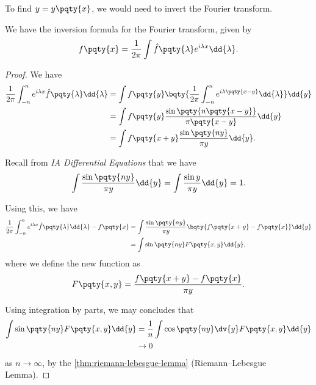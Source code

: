 To find \(y = y\pqty{x}\), we would need to invert the Fourier transform.

\begin{proposition}
    \label{prop:inversion-formula-fourier-transform}%
    We have the inversion formula for the Fourier transform, given by
    \begin{equation}
        f\pqty{x} = \frac{1}{2 \pi} \int \hat{f}\pqty{\lambda} e^{i \lambda x} \dd{\lambda}.
    \end{equation}
\end{proposition}

\begin{proof}
    We have
    \begin{subequations}
        \begin{align}
            \frac{1}{2\pi} \int_{-n}^{n} e^{i \lambda x} \hat{f}\pqty{\lambda} \dd{\lambda} &= \int f\pqty{y} \bqty{\frac{1}{2\pi} \int_{-n}^{n} e^{i \lambda \pqty{x - y}} \dd{\lambda}} \dd{y} \\
            &= \int f\pqty{y} \frac{\sin \pqty{n \pqty{x - y}}}{\pi \pqty{x - y}} \dd{y} \\
            &= \int f\pqty{x + y} \frac{\sin \pqty{n y}}{\pi y} \dd{y}.
        \end{align}
    \end{subequations}

    Recall from \textit{IA Differential Equations} that we have
    \begin{equation}
        \int \frac{\sin \pqty{n y}}{\pi y} \dd{y} = \int \frac{\sin y}{\pi y} \dd{y} = 1.
    \end{equation}

    Using this, we have
    \begin{subequations}
        \begin{align}
            \frac{1}{2\pi} \int_{-n}^{n} e^{i \lambda x} \hat{f}\pqty{\lambda} \dd{\lambda} - f\pqty{x} &= \int \frac{\sin \pqty{n y}}{\pi y} \bqty{f\pqty{x + y} - f\pqty{x}} \dd{y} \\
            &= \int \sin\pqty{ny} F\pqty{x, y} \dd{y},
        \end{align}
    \end{subequations}
    where we define the new function as
    \begin{equation}
        F\pqty{x, y} = \frac{f\pqty{x + y} - f\pqty{x}}{\pi y}.
    \end{equation}

    Using integration by parts, we may concludes that
    \begin{subequations}
        \begin{align}
            \int \sin\pqty{ny} F\pqty{x, y} \dd{y} &= \frac{1}{n} \int \cos\pqty{ny} \dv{y} F\pqty{x, y} \dd{y} \\
            &\to 0
        \end{align}
    \end{subequations}
    as \(n \to \infty\), by the \autoref{thm:riemann-lebesgue-lemma} (Riemann--Lebesgue Lemma).
\end{proof}

